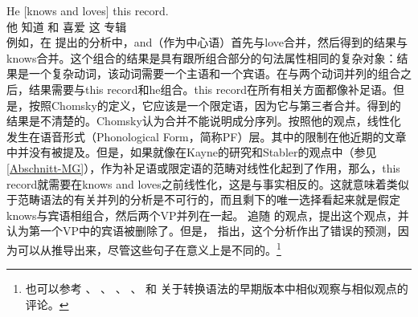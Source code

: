 
\addlines
\ea
\label{ex-he-knows-and-loves-this-record-MP}
\gll He [knows and loves] this record.\\
     他 \spacebr{}知道 和 喜爱 这 专辑\\
\z
例如，在 \citet[]{Steedman91a}提出的分析中，and（作为中心语）首先与love合并，然后得到的结果与knows合并。这个组合的结果是具有跟所组合部分的句法属性相同的复杂对象：结果是一个复杂动词，该动词需要一个主语和一个宾语。在与两个动词并列的组合之后，结果需要与this record和he组合。this record在所有相关方面都像补足语。但是，按照Chomsky的定义，它应该是一个限定语，因为它与第三者合并。得到的结果是不清楚的。Chomsky认为合并不能说明成分序列。按照他的观点，线性化发生在语音形式（Phonological
    Form，简称PF）层。其中的限制在他近期的文章中并没有被提及。但是，如果就像在Kayne的研究和Stabler的观点中（参见\ref{Abschnitt-MG}），作为补足语或限定语的范畴对线性化起到了作用，那么，this record就需要在knows and loves之前线性化，这是与事实相反的。这就意味着类似于范畴语法的有关并列的分析是不可行的，而且剩下的唯一选择看起来就是假定knows与宾语相组合，然后两个VP并列在一起。 \citet[, 67]{Kayne94a-u}追随 \citet[]{WC80a-u}的观点，提出这个观点，并认为第一个VP中的宾语被删除了。但是， \citet[]{Borsley2005a}指出，这个分析作出了错误的预测，因为可以从推导出来，尽管这些句子在意义上是不同的。\footnote{%
也可以参考 、 、 、 、 和 关于转换语法的早期版本中相似观察与相似观点的评论。
}
